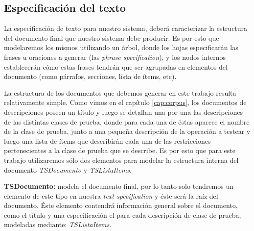 \subsection{Especificación del texto}



La especificación de texto para nuestro sistema, deberá caracterizar la estructura del documento final que nuestro sistema debe producir. Es por esto que modelaremos los mismos utilizando un árbol, donde los hojas especificarán las frases u oraciones a generar (las \emph{phrase specification}), y los nodos internos establecerán cómo estas frases tendrán que ser agrupadas en elementos del documento (como párrafos, secciones, lista de ítems, etc). 

La estructura de los documentos que debemos generar en este trabajo resulta relativamente simple. Como vimos en el capítulo \ref{cap:corpus}, los documentos de descripciones poseen un título y luego se detallan una por una las descripciones de las distintas clases de prueba, donde para cada una de éstas aparece el nombre de la clase de prueba, junto a una pequeña descripción de la operación a testear y luego una lista de ítems que describirán cada una de las restricciones pertenecientes a la clase de prueba que se describe. Es por esto que para este trabajo utilizaremos sólo dos elementos para modelar la estructura interna del documento \emph{TSDocumento} y \emph{TSListaItems}.

\medskip
\noindent
\textbf{TSDocumento:} modela el documento final, por lo tanto solo tendremos un elemento de este tipo en nuestra \emph{text specification} y éste será la raíz del documento. Éste elemento contendrá información general sobre el documento, como el título y una especificación el para cada descripción de clase de prueba, modeladas mediante: \emph{TSListaItems}.

